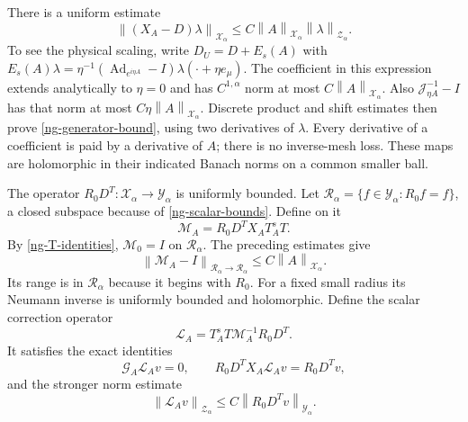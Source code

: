 \documentclass[11pt]{article}
\theoremstyle{remark}
\newcommand{\norm}[1]{\left\|#1\right\|}
\begin{document}
There is a uniform estimate
\begin{equation}\label{ng-generator-bound}
 \norm{(X_A-D)\lambda}_{\mathcal X_\alpha}
       \le C\norm{A}_{\mathcal X_\alpha}
                        \norm{\lambda}_{\mathcal Z_\alpha}.
\end{equation}
To see the physical scaling, write
$D_U=D+E_s(A)$ with
$E_s(A)\lambda=\eta^{-1}(\operatorname{Ad}_{e^{i\eta A}}-I)
\lambda(\cdot+\eta e_\mu)$.
The coefficient in this expression extends analytically to
$\eta=0$ and has $C^{1,\alpha}$ norm at most
$C\norm{A}_{\mathcal X_\alpha}$.
Also $\mathcal J_{\eta A}^{-1}-I$ has that norm at most
$C\eta\norm{A}_{\mathcal X_\alpha}$.
Discrete product and shift estimates then prove
\eqref{ng-generator-bound}, using two derivatives of $\lambda$.
Every derivative of a coefficient is paid by a derivative of $A$;
there is no inverse-mesh loss. These maps are holomorphic in their
indicated Banach norms on a common smaller ball.

The operator $R_0D^T:\mathcal X_\alpha\to\mathcal Y_\alpha$
is uniformly bounded. Let
$\mathcal R_\alpha=\{f\in\mathcal Y_\alpha:R_0f=f\}$,
a closed subspace because of \eqref{ng-scalar-bounds}. Define on it
\begin{equation}\label{ng-fixing-map}
 \mathcal M_A=R_0D^TX_AT_A^sT.
\end{equation}
By \eqref{ng-T-identities}, $\mathcal M_0=I$ on
$\mathcal R_\alpha$. The preceding estimates give
\begin{equation}\label{ng-fixing-smallness}
 \norm{\mathcal M_A-I}_{\mathcal R_\alpha\to\mathcal R_\alpha}
       \le C\norm{A}_{\mathcal X_\alpha}.
\end{equation}
Its range is in $\mathcal R_\alpha$ because it begins with $R_0$.
For a fixed small radius its Neumann inverse is uniformly bounded
and holomorphic. Define the scalar correction operator
\begin{equation}\label{ng-correction}
 \mathcal L_A=T_A^sT\mathcal M_A^{-1}R_0D^T.
\end{equation}
It satisfies the exact identities
\begin{equation}\label{ng-correction-identities}
 \mathcal G_A\mathcal L_Av=0,\qquad
 R_0D^TX_A\mathcal L_Av=R_0D^Tv,
\end{equation}
and the stronger norm estimate
\begin{equation}\label{ng-correction-bound}
 \norm{\mathcal L_Av}_{\mathcal Z_\alpha}
       \le C\norm{R_0D^Tv}_{\mathcal Y_\alpha}.
\end{equation}
\end{document}
